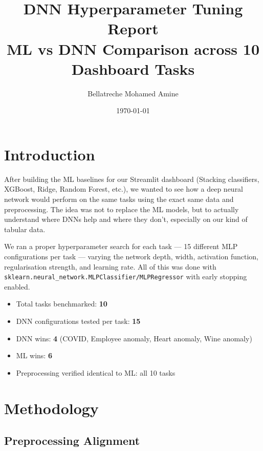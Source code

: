 \documentclass[11pt,a4paper]{article}
\title{DNN Hyperparameter Tuning Report\\{\large ML vs DNN Comparison across 10 Dashboard Tasks}}
\author{Bellatreche Mohamed Amine}
\date{\today}
\begin{document}
\maketitle
\vspace{-0.8em}

\section{Introduction}

After building the ML baselines for our Streamlit dashboard (Stacking classifiers, XGBoost, Ridge, Random Forest, etc.), we wanted to see how a deep neural network would perform on the same tasks using the exact same data and preprocessing.
The idea was not to replace the ML models, but to actually understand where DNNs help and where they don't, especially on our kind of tabular data.

We ran a proper hyperparameter search for each task --- 15 different MLP configurations per task --- varying the network depth, width, activation function, regularisation strength, and learning rate.
All of this was done with \texttt{sklearn.neural\_network.MLPClassifier/MLPRegressor} with early stopping enabled.

\begin{itemize}[leftmargin=1.2em,itemsep=0.2em]
    \item Total tasks benchmarked: \textbf{10}
    \item DNN configurations tested per task: \textbf{15}
    \item DNN wins: \textbf{4} (COVID, Employee anomaly, Heart anomaly, Wine anomaly)
    \item ML wins: \textbf{6}
    \item Preprocessing verified identical to ML: all 10 tasks
\end{itemize}

\section{Methodology}

\subsection{Preprocessing Alignment}
\end{document}
